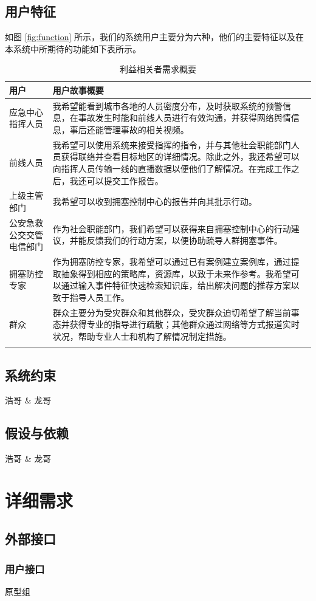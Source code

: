 \documentclass{ctexrep}
\begin{document}
\section{用户特征}
如图 \ref{fig:function} 所示，我们的系统用户主要分为六种，他们的主要特征以及在本系统中所期待的功能如下表所示。
\begin{longtable}{p{2cm}|p{10cm}}
\hline
用户 & 用户故事概要 \\
\hline
\hline
应急中心指挥人员 & 我希望能看到城市各地的人员密度分布，及时获取系统的预警信息，在事故发生时能和前线人员进行有效沟通，并获得网络舆情信息，事后还能管理事故的相关视频。\\
\hline
前线人员 & 我希望可以使用系统来接受指挥的指令，并与其他社会职能部门人员获得联络并查看目标地区的详细情况。除此之外，我还希望可以向指挥人员传输一线的直播数据以便他们了解情况。在完成工作之后，我还可以提交工作报告。\\
\hline
上级主管部门 & 我希望可以收到拥塞控制中心的报告并向其批示行动。 \\
\hline
公安急救公交交管电信部门 & 作为社会职能部门，我们希望可以获得来自拥塞控制中心的行动建议，并能反馈我们的行动方案，以便协助疏导人群拥塞事件。 \\
\hline
拥塞防控专家 & 作为拥塞防控专家，我希望可以通过已有案例建立案例库，通过提取抽象得到相应的策略库，资源库，以致于未来作参考。我希望可以通过输入事件特征快速检索知识库，给出解决问题的推荐方案以致于指导人员工作。\\
\hline
群众 & 群众主要分为受灾群众和其他群众，受灾群众迫切希望了解当前事态并获得专业的指导进行疏散；其他群众通过网络等方式报道实时状况，帮助专业人士和机构了解情况制定措施。\\
\hline
\caption{\label{tab:stakeholder} 利益相关者需求概要}
\end{longtable}
\section{系统约束}
浩哥 \& 龙哥
\section{假设与依赖}
浩哥 \& 龙哥
\chapter{详细需求}
\section{外部接口}
\subsection{用户接口}
原型组
\end{document}
